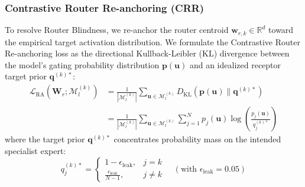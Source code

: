 \documentclass{article}
\theoremstyle{definition}
\begin{document}
\subsubsection{Contrastive Router Re-anchoring (CRR)}
To resolve Router Blindness, we re-anchor the router centroid $\mathbf{w}_{r, k} \in \mathbb{R}^d$ toward the empirical target activation distribution. We formulate the Contrastive Router Re-anchoring loss as the directional Kullback-Leibler (KL) divergence between the model's gating probability distribution $\mathbf{p}(\mathbf{u})$ and an idealized receptor target prior $\mathbf{q}^{(k)*}$:
\begin{equation}
\begin{aligned}
\mathcal{L}_{\text{RA}}(\mathbf{W}_r; \mathcal{M}_l^{(k)}) &= \frac{1}{|\mathcal{M}_l^{(k)}|} \sum_{\mathbf{u} \in \mathcal{M}_l^{(k)}} D_{\text{KL}}(\mathbf{p}(\mathbf{u}) \parallel \mathbf{q}^{(k)*}) \\
&= \frac{1}{|\mathcal{M}_l^{(k)}|} \sum_{\mathbf{u} \in \mathcal{M}_l^{(k)}} \sum_{j=1}^N p_j(\mathbf{u}) \log\left(\frac{p_j(\mathbf{u})}{q_j^{(k)*}}\right)
\end{aligned}
\label{eq:crr_loss}
\end{equation}
where the target prior $\mathbf{q}^{(k)*}$ concentrates probability mass on the intended specialist expert:
\begin{equation}
q_j^{(k)*} = \begin{cases} 1 - \epsilon_{\text{leak}}, & j = k \\ \frac{\epsilon_{\text{leak}}}{N - 1}, & j \neq k \end{cases} \quad (\text{with } \epsilon_{\text{leak}} = 0.05)
\end{equation}
\end{document}
